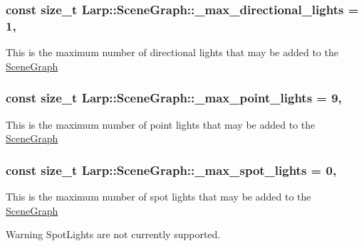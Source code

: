 \subsubsection[{\texorpdfstring{\+\_\+max\+\_\+directional\+\_\+lights}{_max_directional_lights}}]{\setlength{\rightskip}{0pt plus 5cm}const size\+\_\+t Larp\+::\+Scene\+Graph\+::\+\_\+max\+\_\+directional\+\_\+lights = 1\hspace{0.3cm}{\ttfamily [static]}, {\ttfamily [private]}}\hypertarget{classLarp_1_1SceneGraph_aabaeceb65dc86a8f0b84c4a1a099e3d7}{}\label{classLarp_1_1SceneGraph_aabaeceb65dc86a8f0b84c4a1a099e3d7}
This is the maximum number of directional lights that may be added to the \hyperlink{classLarp_1_1SceneGraph}{Scene\+Graph} 
\subsubsection[{\texorpdfstring{\+\_\+max\+\_\+point\+\_\+lights}{_max_point_lights}}]{\setlength{\rightskip}{0pt plus 5cm}const size\+\_\+t Larp\+::\+Scene\+Graph\+::\+\_\+max\+\_\+point\+\_\+lights = 9\hspace{0.3cm}{\ttfamily [static]}, {\ttfamily [private]}}\hypertarget{classLarp_1_1SceneGraph_a1bf0c7f3098c5edfe843d310a4c88f70}{}\label{classLarp_1_1SceneGraph_a1bf0c7f3098c5edfe843d310a4c88f70}
This is the maximum number of point lights that may be added to the \hyperlink{classLarp_1_1SceneGraph}{Scene\+Graph} 
\subsubsection[{\texorpdfstring{\+\_\+max\+\_\+spot\+\_\+lights}{_max_spot_lights}}]{\setlength{\rightskip}{0pt plus 5cm}const size\+\_\+t Larp\+::\+Scene\+Graph\+::\+\_\+max\+\_\+spot\+\_\+lights = 0\hspace{0.3cm}{\ttfamily [static]}, {\ttfamily [private]}}\hypertarget{classLarp_1_1SceneGraph_a3f308c89413969e78b25014dcaedab1f}{}\label{classLarp_1_1SceneGraph_a3f308c89413969e78b25014dcaedab1f}
This is the maximum number of spot lights that may be added to the \hyperlink{classLarp_1_1SceneGraph}{Scene\+Graph} \begin{DoxyWarning}{Warning}
Spot\+Lights are not currently supported. 
\end{DoxyWarning}
